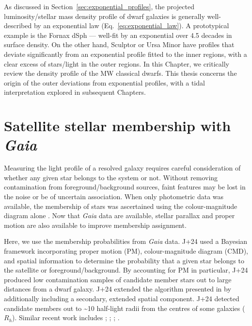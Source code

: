 As discussed in Section~\ref{sec:exponential_profiles}, the projected
luminosity/stellar mass density profile of dwarf galaxies is generally
well-described by an exponential law (Eq.~\ref{eq:exponential_law}). A
prototypical example is the Fornax dSph --- well-fit by an exponential
over 4.5 decades in surface density. On the other hand, Sculptor or Ursa
Minor have profiles that deviate significantly from an exponential
profile fitted to the inner regions, with a clear excess of stars/light
in the outer regions. In this Chapter, we critically review the density
profile of the MW classical dwarfs. This thesis concerns the origin of
the outer deviations from exponential profiles, with a tidal
interpretation explored in subsequent Chapters.

\section{\texorpdfstring{Satellite stellar membership with
\emph{Gaia}}{Satellite stellar membership with Gaia}}\label{sec:the_algorithm}

Measuring the light profile of a resolved galaxy requires careful
consideration of whether any given star belongs to the system or not.
Without removing contamination from foreground/background sources, faint
features may be lost in the noise or be of uncertain association. When
only photometric data was available, the membership of stars was
ascertained using the colour-magnitude diagram alone \citep[e.g.,
matched filter methods like those used by][]{rockosi+2002}. Now that
\emph{Gaia} data are available, stellar parallax and proper motion are
also available to improve membership assignment.

Here, we use the  membership
probabilities from \emph{Gaia} data. J+24 used a Bayesian framework
incorporating proper motion (PM), colour-magnitude diagram (CMD), and
spatial information to determine the probability that a given star
belongs to the satellite or foreground/background. By accounting for PM
in particular, J+24 produced low contamination samples of candidate
member stars out to large distances from a dwarf galaxy. J+24 extended
the algorithm presented in \citet{MV2020a, MV2020b} by additionally
including a secondary, extended spatial component. J+24 detected
candidate members out to \textasciitilde10 half-light radii from the
centres of some galaxies (\(R_h\)). Similar recent work includes
\citet{pace+li2019}; \citet{battaglia+2022}; \citet{pace+erkal+li2022};
\citet{qi+2022}.


